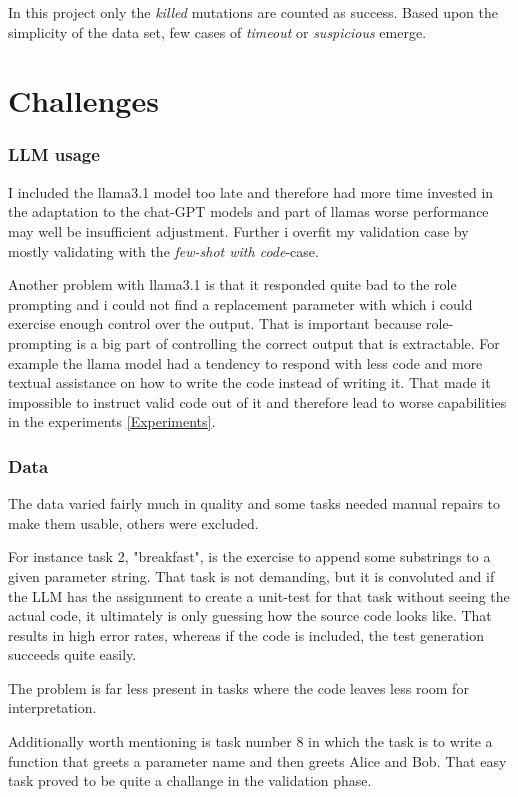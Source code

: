 \documentclass[a4paper,11pt,oneside]{memoir}
\begin{document}
In this project only the \textit{killed} mutations are counted as success. Based upon the simplicity of the data set, few cases of \textit{timeout} or \textit{suspicious} emerge.

\section{Challenges}
\subsubsection{LLM usage}
I included the llama3.1 model too late and therefore had more time invested in the adaptation to the chat-GPT models and part of llamas worse performance may well be insufficient adjustment. Further i overfit my validation case by mostly validating with the \textit{few-shot with code}-case.

Another problem with llama3.1 is that it responded quite bad to the role prompting and i could not find a replacement parameter with which i could exercise enough control over the output. That is important because role-prompting is a big part of controlling the correct output that is extractable. 
For example the llama model had a tendency to respond with less code and more textual assistance on how to write the code instead of writing it. That made it impossible to instruct valid code out of it and therefore lead to worse capabilities in the experiments \ref{Experiments}.

\subsubsection{Data}
\label{Challanges:Data}

The data varied fairly much in quality and some tasks needed manual repairs to make them usable, others were excluded. 

For instance task 2, "breakfast",  is the exercise to append some substrings to a given parameter string. That task is not demanding, but it is convoluted and if the LLM has the assignment to create a unit-test for that task without seeing the actual code, it ultimately is only guessing how the source code looks like. That results in high error rates, whereas if the code is included, the test generation succeeds quite easily.

The problem is far less present in tasks where the code leaves less room for interpretation.

Additionally worth mentioning is task number 8 in which the task is to write a function that greets a parameter name and then greets Alice and Bob. That easy task proved to be quite a challange in the validation phase.
\end{document}
